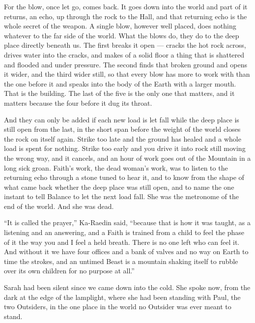 For the blow, once let go, comes back. It goes down into the world and part of it returns, an echo, up through the rock to the Hall, and that returning echo is the whole secret of the weapon. A single blow, however well placed, does nothing whatever to the far side of the world. What the blows do, they do to the deep place directly beneath us. The first breaks it open --- cracks the hot rock across, drives water into the cracks, and makes of a solid floor a thing that is shattered and flooded and under pressure. The second finds that broken ground and opens it wider, and the third wider still, so that every blow has more to work with than the one before it and speaks into the body of the Earth with a larger mouth. That is the building. The last of the five is the only one that matters, and it matters because the four before it dug its throat.\par

And they can only be added if each new load is let fall while the deep place is still open from the last, in the short span before the weight of the world closes the rock on itself again. Strike too late and the ground has healed and a whole load is spent for nothing. Strike too early and you drive it into rock still moving the wrong way, and it cancels, and an hour of work goes out of the Mountain in a long sick groan. Faith's work, the dead woman's work, was to listen to the returning echo through a stone tuned to hear it, and to know from the shape of what came back whether the deep place was still open, and to name the one instant to tell Balance to let the next load fall. She was the metronome of the end of the world. And she was dead.\par

``It is called the prayer,'' Ka-Raedin said, ``because that is how it was taught, as a listening and an answering, and a Faith is trained from a child to feel the phase of it the way you and I feel a held breath. There is no one left who can feel it. And without it we have four offices and a bank of valves and no way on Earth to time the strokes, and an untimed Beast is a mountain shaking itself to rubble over its own children for no purpose at all.''\par

Sarah had been silent since we came down into the cold. She spoke now, from the dark at the edge of the lamplight, where she had been standing with Paul, the two Outsiders, in the one place in the world no Outsider was ever meant to stand.\par

